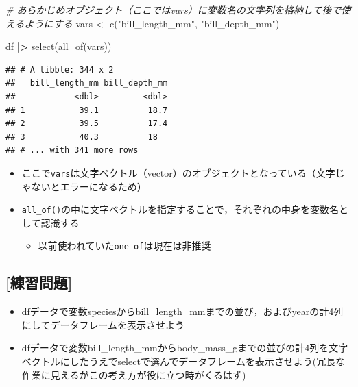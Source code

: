 \documentclass[
  xelatex,ja=standard, b5paper]{bxjsbook}
\newenvironment{Shaded}{\begin{snugshade}}{\end{snugshade}}
\newcommand{\CommentTok}[1]{\textcolor[rgb]{0.56,0.35,0.01}{\textit{#1}}}
\newcommand{\ErrorTok}[1]{\textcolor[rgb]{0.64,0.00,0.00}{\textbf{#1}}}
\newcommand{\FunctionTok}[1]{\textcolor[rgb]{0.00,0.00,0.00}{#1}}
\newcommand{\NormalTok}[1]{#1}
\newcommand{\OtherTok}[1]{\textcolor[rgb]{0.56,0.35,0.01}{#1}}
\newcommand{\SpecialCharTok}[1]{\textcolor[rgb]{0.00,0.00,0.00}{#1}}
\newcommand{\StringTok}[1]{\textcolor[rgb]{0.31,0.60,0.02}{#1}}
\providecommand{\tightlist}{%
  \setlength{\itemsep}{0pt}\setlength{\parskip}{0pt}}
\begin{document}
\begin{Shaded}
\begin{Highlighting}[]
\CommentTok{\# あらかじめオブジェクト（ここではvars）に変数名の文字列を格納して後で使えるようにする}
\NormalTok{vars }\OtherTok{\textless{}{-}} \FunctionTok{c}\NormalTok{(}\StringTok{"bill\_length\_mm"}\NormalTok{, }\StringTok{"bill\_depth\_mm"}\NormalTok{)}

\NormalTok{df }\SpecialCharTok{|}\ErrorTok{\textgreater{}} 
  \FunctionTok{select}\NormalTok{(}\FunctionTok{all\_of}\NormalTok{(vars))}
\end{Highlighting}
\end{Shaded}

\begin{verbatim}
## # A tibble: 344 x 2
##   bill_length_mm bill_depth_mm
##            <dbl>         <dbl>
## 1           39.1          18.7
## 2           39.5          17.4
## 3           40.3          18  
## # ... with 341 more rows
\end{verbatim}

\begin{itemize}
\tightlist
\item
  ここで\texttt{vars}は文字ベクトル（vector）のオブジェクトとなっている（文字じゃないとエラーになるため）
\item
  \texttt{all\_of()}の中に文字ベクトルを指定することで，それぞれの中身を変数名として認識する

  \begin{itemize}
  \tightlist
  \item
    以前使われていた\texttt{one\_of}は現在は非推奨
  \end{itemize}
\end{itemize}

\hypertarget{ux7df4ux7fd2ux554fux984c}{%
\subsection{{[}練習問題{]}}\label{ux7df4ux7fd2ux554fux984c}}

\begin{itemize}
\item
  dfデータで変数speciesからbill\_length\_mmまでの並び，およびyearの計4列にしてデータフレームを表示させよう
\item
  dfデータで変数bill\_length\_mmからbody\_mass\_gまでの並びの計4列を文字ベクトルにしたうえでselectで選んでデータフレームを表示させよう(冗長な作業に見えるがこの考え方が役に立つ時がくるはず)
\end{itemize}
\end{document}
